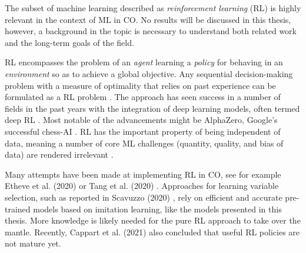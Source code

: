 The subset of machine learning described as \textit{reinforcement learning} (\gls{RL}) is highly relevant in the context of \gls{ML} in \gls{CO}. No results will be discussed in this thesis, however, a background in the topic is necessary to understand both related work and the long-term goals of the field.

\gls{RL} encompasses the problem of an \textit{agent} learning a \textit{policy} for behaving in an \textit{environment} so as to achieve a global objective. Any sequential decision-making problem with a measure of optimality that relies on past experience can be formulated as a \gls{RL} problem \cite{francois2018introduction}. The approach has seen success in a number of fields in the past years with the integration of deep learning models, often termed deep \gls{RL} \cite{francois2018introduction}. Most notable of the advancements might be AlphaZero, Google's successful chess-AI \cite{silver2017mastering}. \gls{RL} has the important property of being independent of data, meaning a number of core \gls{ML} challenges (quantity, quality, and bias of data) are rendered irrelevant \cite{goodfellow2016deep}. 


Many attempts have been made at implementing \gls{RL} in \gls{CO}, see for example Etheve et al. (2020) \cite{etheve2020reinforcement} or Tang et al. (2020) \cite{tang2020reinforcement}. Approaches for learning variable selection, such as reported in Scavuzzo (2020) \cite{scavuzzo2020learning}, rely on efficient and accurate pre-trained models based on imitation learning, like the models presented in this thesis. More knowledge is likely needed for the pure \gls{RL} approach to take over the mantle. Recently,
Cappart et al. (2021) \cite{cappart2021combinatorial} also concluded that useful \gls{RL} policies are not mature yet. 
